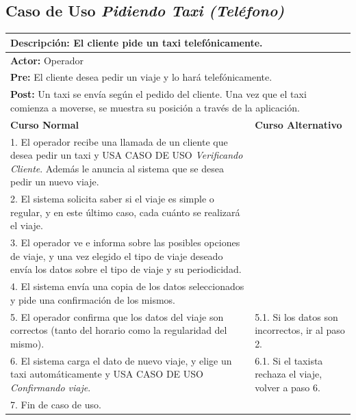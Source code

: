 \documentclass[a4paper]{article}
\begin{document}
\subsection{Caso de Uso \textit{Pidiendo Taxi (Tel\'efono)}}
\begin{center}
\begin{tabular}{|p{10cm} | p{6cm}|}
\hline
\multicolumn{2}{|p{15cm}|}{\textbf{Descripci\'on:} El cliente pide un taxi telef\'onicamente.} \\
\hline
\multicolumn{2}{|p{15cm}|}{\textbf{Actor:} Operador } \\
\hline
\multicolumn{2}{|p{15cm}|}{\textbf{Pre:} El cliente desea pedir un viaje y lo har\'a telef\'onicamente.} \\
\hline
\multicolumn{2}{|p{15cm}|}{\textbf{Post:} Un taxi se env\'ia seg\'un el pedido del cliente. Una vez que el taxi comienza a moverse, se muestra su posici\'on a trav\'es de la aplicaci\'on. }\\
\hline
\textbf{Curso Normal}  & \textbf{Curso Alternativo} \\ \hline
1. El operador recibe una llamada de un cliente que desea pedir un taxi y USA CASO DE USO \textit{Verificando Cliente}. Adem\'as le anuncia al sistema que se desea pedir un nuevo viaje. & \\ \hline
2. El sistema solicita saber si el viaje es simple o regular, y en este \'ultimo caso, cada cu\'anto se realizar\'a el viaje. & \\ \hline
3. El operador ve e informa sobre las posibles opciones de viaje, y una vez elegido el tipo de viaje deseado env\'ia los datos sobre el tipo de viaje y su periodicidad. & \\ \hline
4. El sistema env\'ia una copia de los datos seleccionados y pide una confirmaci\'on de los mismos. & \\ \hline
5. El operador confirma que los datos del viaje son correctos (tanto del horario como la regularidad del mismo). & 5.1. Si los datos son incorrectos, ir al paso 2. \\ \hline
6. El sistema carga el dato de nuevo viaje, y elige un taxi autom\'aticamente y USA CASO DE USO \textit{Confirmando viaje}. & 6.1. Si el taxista rechaza el viaje, volver a paso 6. \\ \hline
7. Fin de caso de uso. & \\ \hline
\end{tabular}
\end{center}
\end{document}
